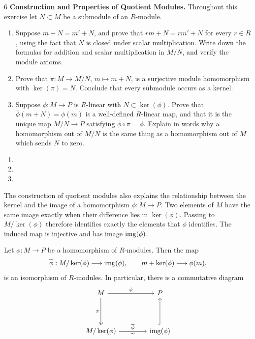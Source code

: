 \documentclass[Notebook.tex]{subfiles}
\begin{document}
\begin{problem}{6}\label{m:quotient}
	\textbf{Construction and Properties of Quotient Modules.} Throughout this exercise let $N\subset M$ be a submodule of an $R$-module.
	\begin{enumerate}[label=(\alph*),ref=\theenumi\alph*]
		\item Suppose $m+N=m'+N$, and prove that $rm+N=rm'+N$ for every $r\in R$, using the fact that $N$ is closed under scalar multiplication. Write down the formulas for addition and scalar multiplication in $M/N$, and verify the module axioms.
		\item Prove that $\pi:M\to M/N$, $m\mapsto m+N$, is a surjective module homomorphism with $\ker(\pi)=N$. Conclude that every submodule occurs as a kernel.
		\item Suppose $\phi:M\to P$ is $R$-linear with $N\subset\ker(\phi)$. Prove that $\overline{\phi}(m+N)=\phi(m)$ is a well-defined $R$-linear map, and that it is the unique map $M/N\to P$ satisfying $\overline{\phi}\circ \pi=\phi$. Explain in words why a homomorphism out of $M/N$ is the same thing as a homomorphism out of $M$ which sends $N$ to zero.
	\end{enumerate}
\end{problem}

\begin{solution}
	\bbni
	\begin{enumerate}[label=(\alph*),ref=\theenumi\alph*]
		\item
		\item
		\item
	\end{enumerate}
\end{solution}

\newpage

The construction of quotient modules also explains the relationship between the kernel and the image of a homomorphism $\phi:M\to P$. Two elements of $M$ have the same image exactly when their difference lies in $\ker(\phi)$. Passing to $M/\ker(\phi)$ therefore identifies exactly the elements that $\phi$ identifies. The induced map is injective and has image $\operatorname{img}(\phi)$.

\begin{theorem}
	Let $\phi:M\to P$ be a homomorphism of $R$-modules. Then the map
	\[
	\overline{\phi}:M/\ker(\phi)\longrightarrow\operatorname{img}(\phi),
	\qquad m+\ker(\phi)\longmapsto \phi(m),
	\]
	is an isomorphism of $R$-modules. In particular, there is a commutative diagram
	\[
	\begin{tikzcd}[row sep=4em,column sep=4em]
		M \arrow[r,"\phi"] \arrow[d,two heads,"\pi"'] & P \\
		M/\ker(\phi) \arrow[r,"\overline{\phi}","\sim"'] & \img(\phi) \arrow[u,hook]
	\end{tikzcd}
	\]
\end{theorem}
\end{document}
